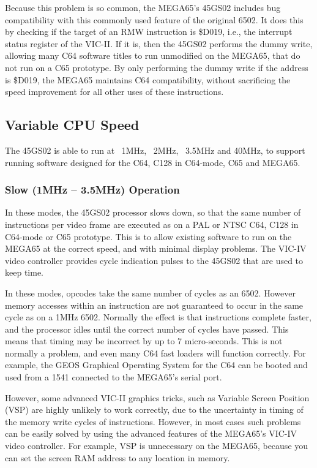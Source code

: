 Because this problem is so common, the MEGA65's 45GS02 includes bug
compatibility with this
commonly used feature of the original 6502.  It does this by checking
if the target of an RMW
instruction is \$D019, i.e., the interrupt status register of the VIC-II.
If it is, then
the 45GS02 performs the dummy write, allowing many C64 software titles
to run unmodified on the
MEGA65, that do not run on a C65 prototype.  By only performing the
dummy write if the address
is \$D019, the MEGA65 maintains C64 compatibility, without sacrificing
the speed improvement
for all other uses of these instructions.

\subsection{Variable CPU Speed}

The 45GS02 is able to run at ~1MHz, ~2MHz, ~3.5MHz and 40MHz,
to support running software
designed for the C64, C128 in C64-mode, C65 and MEGA65.

\subsubsection{Slow (1MHz -- 3.5MHz) Operation}
In these modes, the 45GS02 processor slows down, so that the same number of instructions
per video frame are executed as on a PAL or NTSC C64, C128 in C64-mode or C65 prototype.
This is to allow existing software to run on the MEGA65 at the correct speed, and with
minimal display problems.  The VIC-IV video controller provides cycle indication pulses
to the 45GS02 that are used to keep time.

In these modes, opcodes take the same number of cycles as an 6502.
However memory accesses within an
instruction are not guaranteed to occur in the same cycle as on a 1MHz 6502.  Normally
the effect is that instructions complete faster, and the processor idles until the
correct number of cycles have passed. This means that timing may be incorrect by up to
7 micro-seconds.  This is not normally a problem, and even many C64 fast loaders will
function correctly. For example, the GEOS\texttrademark{} Graphical Operating System for the C64
can be booted and used from a 1541 connected to the MEGA65's serial port.

However, some advanced VIC-II graphics tricks, such as Variable Screen
Position (VSP) are
highly unlikely to work correctly, due to the uncertainty in timing of the memory write
cycles of instructions.  However, in most cases such problems can be
easily solved by using
the advanced features of the MEGA65's VIC-IV video controller.
For example, VSP is unnecessary
on the MEGA65, because you can set the screen RAM address to any location in memory.

